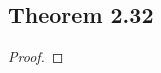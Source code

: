 \documentclass[../../main.tex]{subfiles}
\begin{document}
\subsection{Theorem 2.32}
\begin{wts}

\end{wts}
\begin{proof}

\end{proof}
\end{document}
